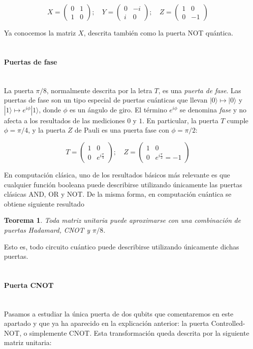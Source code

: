 \documentclass[11pt]{article}
\newcommand{\ra}{\rangle}
\newcommand{\myparagraph}[1]{\paragraph*{ \\ #1}\mbox{}\\}
\theoremstyle{plain}
\newtheorem*{theorem*}{Teorema}
\begin{document}
\[
X =
	\begin{pmatrix}
		0 & 1 \\
		1 & 0 
	\end{pmatrix}; \quad
	Y =
	\begin{pmatrix}
		0 & -i \\
		i & 0 
	\end{pmatrix}; \quad
	Z =
	\begin{pmatrix}
		1 & 0 \\
		0 & -1 
	\end{pmatrix}
\]

Ya conocemos la matriz $X$, descrita también como la puerta NOT quántica. \\


\myparagraph{Puertas de fase}


La puerta $\pi/8$, normalmente descrita por la letra $T$, es una \emph{puerta de fase}. Las puertas de fase son un tipo especial de puertas cuánticas que llevan $|0\ra \mapsto |0\ra$ y $|1\ra \mapsto e^{i\phi}|1\ra$, donde $\phi$ es un ángulo de giro. El término $e^{i\phi}$ se denomina \emph{fase} y no afecta a los resultados de las mediciones $0$ y $1$. En particular, la puerta $T$ cumple $\phi = \pi/4$, y la puerta $Z$ de Pauli es una puerta fase con $\phi = \pi/2$:

\[
	T =
	\begin{pmatrix}
		1 & 0 \\
		0 & e^{i\frac{\pi}{4}}
	\end{pmatrix}; \quad
	Z =
	\begin{pmatrix}
		1 & 0 \\
		0 & e^{i\frac{\pi}{2}} = -1
	\end{pmatrix}
\]

En computación clásica, uno de los resultados básicos más relevante es que cualquier función booleana puede describirse utilizando únicamente las puertas clásicas AND, OR y NOT. De la misma forma, en computación cuántica se obtiene siguiente resultado

\begin{theorem*}
	Toda matriz unitaria puede aproximarse con una combinación de puertas Hadamard, CNOT y $\pi/8$.
\end{theorem*}

Esto es, todo circuito cuántico puede describirse utilizando únicamente dichas puertas.


\myparagraph{Puerta CNOT}


Pasamos a estudiar la única puerta de dos qubits que comentaremos en este apartado y que ya ha aparecido en la explicación anterior: la puerta Controlled-NOT, o simplemente CNOT. Esta transformación queda descrita por la siguiente matriz unitaria:
\end{document}
